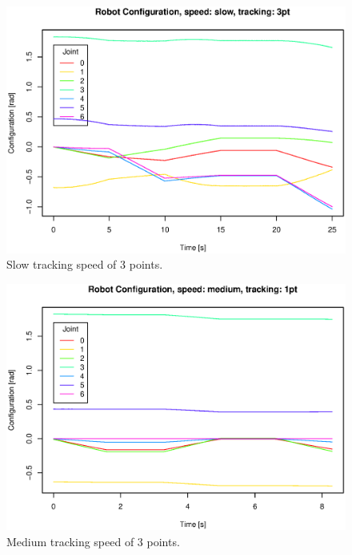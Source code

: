 \begin{figure}[H]
\centering
\includegraphics[width= \fullImageWidth]{graphics/robotics/robotConfiguration_slow_3pt}
\caption{Slow tracking speed of 3 points.}
\label{fig:robotic_conf_slow_3pt}
\end{figure}

\begin{figure}[H]
\centering
\includegraphics[width= \fullImageWidth]{graphics/robotics/robotConfiguration_medium_1pt}
\caption{Medium tracking speed of 3 points.}
\label{fig:robotic_conf_medium_1pt}
\end{figure}

